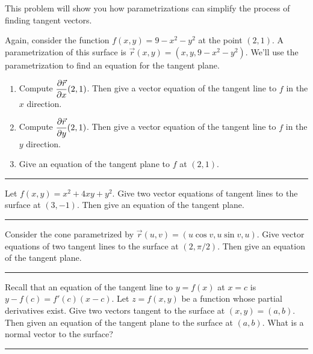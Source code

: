 This problem will show you how parametrizations can simplify the process of finding tangent vectors.
\begin{problem}%
 Again, consider the function $f(x,y)=9-x^2-y^2$ at the point $(2,1)$. A parametrization of this surface is $\vec r(x,y) = (x,y,9-x^2-y^2)$. We'll use the parametrization to find an equation for the tangent plane.
\begin{enumerate}
 \item Compute $\displaystyle\frac{\partial \vec r}{\partial x}(2,1)$. Then give a vector equation of the tangent line to $f$ in the $x$ direction.
 \item Compute $\displaystyle\frac{\partial \vec r}{\partial y}(2,1)$. Then give a vector equation of the tangent line to $f$ in the $y$ direction.
 \item Give an equation of the tangent plane to $f$ at $(2,1)$. 
\end{enumerate}
\hrule\end{problem}

\begin{problem}%
 Let $f(x,y)=x^2+4xy+y^2$.  Give two vector equations of tangent lines to the surface at $(3,-1)$. Then give an equation of the tangent plane.
\hrule\end{problem}

\begin{problem}%
 Consider the cone parametrized by $\vec r(u,v)=(u\cos v, u\sin v,u)$.  Give vector equations of two tangent lines to the surface at $(2,\pi/2)$. Then give an equation of the tangent plane.
\hrule\end{problem}

\begin{problem}\label{general tangent plane with partials}%
 Recall that an equation of the tangent line to $y=f(x)$ at $x=c$ is $y-f(c)=f'(c)(x-c)$. Let $z=f(x,y)$ be a function whose partial derivatives exist. Give two vectors tangent to the surface at $(x,y)=(a,b)$.  Then given an equation of the tangent plane to the surface at $(a,b)$.  What is a normal vector to the surface?
\hrule\end{problem}

